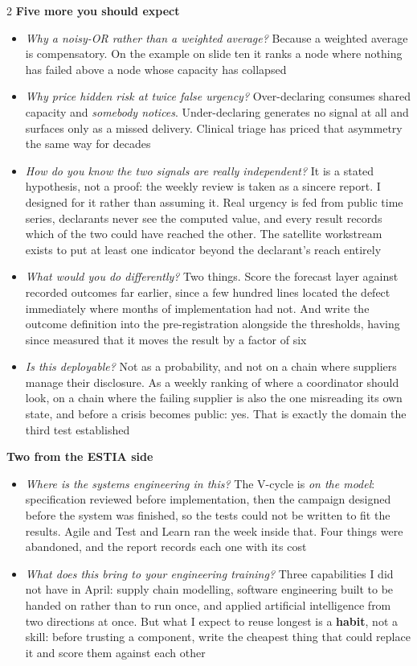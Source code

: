 \documentclass[a4paper,8pt]{extarticle}
\begin{document}
\begin{multicols}{2}
\vspace{5pt}
{\bfseries\color{altenNavy}Five more you should expect}
\begin{itemize}
  \item \emph{Why a noisy-OR rather than a weighted average?} Because a weighted average is compensatory. On the example on slide ten it ranks a node where nothing has failed above a node whose capacity has collapsed
  \item \emph{Why price hidden risk at twice false urgency?} Over-declaring consumes shared capacity and \emph{somebody notices}. Under-declaring generates no signal at all and surfaces only as a missed delivery. Clinical triage has priced that asymmetry the same way for decades
  \item \emph{How do you know the two signals are really independent?} It is a stated hypothesis, not a proof: the weekly review is taken as a sincere report. I designed for it rather than assuming it. Real urgency is fed from public time series, declarants never see the computed value, and every result records which of the two could have reached the other. The satellite workstream exists to put at least one indicator beyond the declarant's reach entirely
  \item \emph{What would you do differently?} Two things. Score the forecast layer against recorded outcomes far earlier, since a few hundred lines located the defect immediately where months of implementation had not. And write the outcome definition into the pre-registration alongside the thresholds, having since measured that it moves the result by a factor of six
  \item \emph{Is this deployable?} Not as a probability, and not on a chain where suppliers manage their disclosure. As a weekly ranking of where a coordinator should look, on a chain where the failing supplier is also the one misreading its own state, and before a crisis becomes public: yes. That is exactly the domain the third test established
\end{itemize}

\vspace{4pt}
{\bfseries\color{altenNavy}Two from the ESTIA side}
\begin{itemize}
  \item \emph{Where is the systems engineering in this?} The V-cycle is \emph{on the model}: specification reviewed before implementation, then the campaign designed before the system was finished, so the tests could not be written to fit the results. Agile and Test and Learn ran the week inside that. Four things were abandoned, and the report records each one with its cost
  \item \emph{What does this bring to your engineering training?} Three capabilities I did not have in April: supply chain modelling, software engineering built to be handed on rather than to run once, and applied artificial intelligence from two directions at once. But what I expect to reuse longest is a \textbf{habit}, not a skill: before trusting a component, write the cheapest thing that could replace it and score them against each other
\end{itemize}

\end{multicols}
\end{document}

